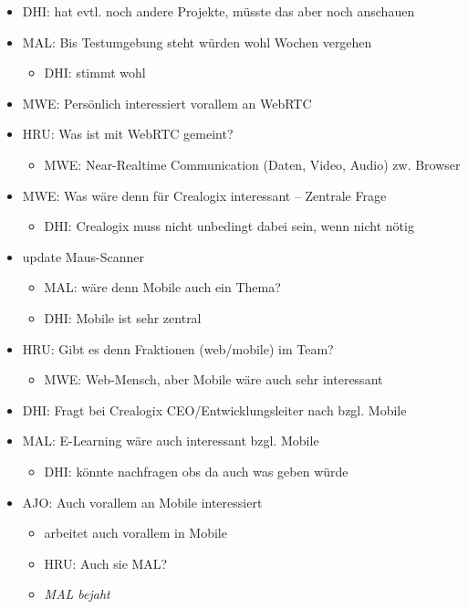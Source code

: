 \begin{itemize}
\begin{itemize}
	\end{itemize}
	\item DHI: hat evtl. noch andere Projekte, müsste das aber noch anschauen
	\item MAL: Bis Testumgebung steht würden wohl Wochen vergehen
	\begin{itemize}
		\item DHI: stimmt wohl
	\end{itemize}
	\item MWE: Persönlich interessiert vorallem an WebRTC
	\item HRU: Was ist mit WebRTC gemeint? 
	\begin{itemize}
		\item MWE: Near-Realtime Communication (Daten, Video, Audio) zw. Browser
	\end{itemize}
	\item MWE: Was wäre denn für Crealogix interessant -- Zentrale Frage
	\begin{itemize}
		\item DHI: Crealogix muss nicht unbedingt dabei sein, wenn nicht nötig
	\end{itemize}
	\item update Maus-Scanner
	\begin{itemize}
		\item MAL: wäre denn Mobile auch ein Thema?
		\item DHI: Mobile ist sehr zentral
	\end{itemize}
	\item HRU: Gibt es denn Fraktionen (web/mobile) im Team?
	\begin{itemize}
		\item MWE: Web-Mensch, aber Mobile wäre auch sehr interessant
	\end{itemize}
	\item DHI: Fragt bei Crealogix CEO/Entwicklungsleiter nach bzgl. Mobile
	\item MAL: E-Learning wäre auch interessant bzgl. Mobile
	\begin{itemize}
		\item DHI: könnte nachfragen obs da auch was geben würde
	\end{itemize}
	\item AJO: Auch vorallem an Mobile interessiert
	\begin{itemize}
		\item arbeitet auch vorallem in Mobile
		\item HRU: Auch sie MAL?
		\item \emph{MAL bejaht}

\end{itemize}
\end{itemize}
